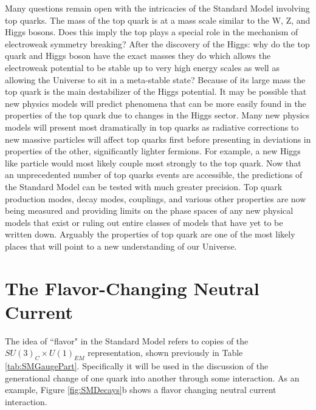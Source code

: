 Many questions remain open with the intricacies of the Standard Model involving top quarks.  The mass of the top quark is at a mass scale similar to the W, Z, and Higgs bosons.  Does this imply the top plays a special role in the mechanism of electroweak symmetry breaking?  After the discovery of the Higgs: why do the top quark and Higgs boson have the exact masses they do which allows the electroweak potential to be stable up to very high energy scales as well as allowing the Universe to sit in a meta-stable state\cite{TopReview}?  Because of its large mass the top quark is the main destabilizer of the Higgs potential.  It may be possible that new physics models will predict phenomena that can be more easily found in the properties of the top quark due to changes in the Higgs sector.  Many new physics models will present most dramatically in top quarks as radiative corrections to new massive particles will affect top quarks first before presenting in deviations in properties of the other, significantly lighter fermions.  For example, a new Higgs like particle would most likely couple most strongly to the top quark.  
 Now that an unprecedented number of top quarks events are accessible, the predictions of the Standard Model can be tested with much greater precision.  Top quark production modes, decay modes, couplings, and various other properties are now being measured and providing limits on the phase spaces of any new physical models that exist or ruling out entire classes of models that have yet to be written down.  Arguably the properties of top quark are one of the most likely places that will point to a new understanding of our Universe.


\section{The Flavor-Changing Neutral Current}
\label{sec:FCNC}
  The idea of ``flavor" in the Standard Model refers to copies of the $SU(3)_C \times U(1)_{EM}$ representation, shown previously in Table \ref{tab:SMGaugePart}.  Specifically it will be used in the discussion of the generational change of one quark into another through some interaction.  As an example, Figure \ref{fig:SMDecays}b shows a flavor changing neutral current interaction.
